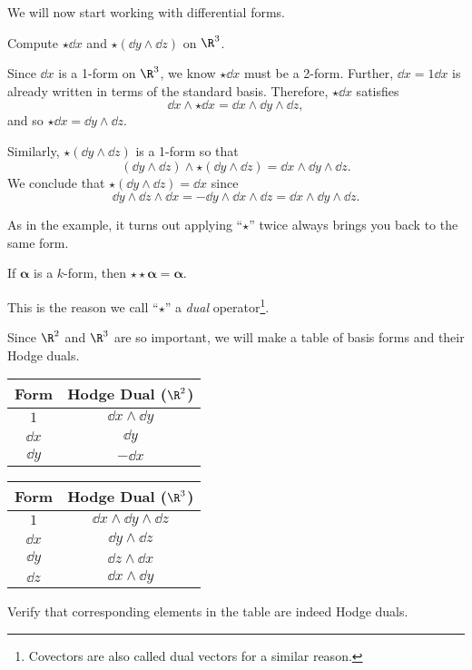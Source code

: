 We will now start working with differential forms.
\begin{example}
	Compute $\star \dd x$ and $\star (\dd y\wedge \dd z)$ on $\R^3$.

	Since $\dd x$ is a 1-form on $\R^3$, we know $\star \dd x$ must be a
	2-form.  Further, $\dd x=1\dd x$ is already written in terms of the standard
	basis.  Therefore, $\star \dd x$ satisfies
	\[
		\dd x\wedge \star \dd x = \dd x\wedge \dd y\wedge \dd z,
	\]
	and so $\star \dd x = \dd y\wedge \dd z$.

	Similarly, $\star (\dd y\wedge \dd z)$ is a 1-form so that
	\[
		(\dd y\wedge \dd z)\wedge \star (\dd y\wedge \dd z) =\dd x\wedge \dd y\wedge \dd z.
	\]
	We conclude that $\star (\dd y\wedge \dd z) = \dd x$ since
	\[
		\dd y\wedge \dd z\wedge \dd x = -\dd y\wedge \dd x\wedge \dd z = \dd x\wedge \dd y\wedge \dd z.
	\]
\end{example}
As in the example, it turns out applying ``$\star$'' twice always brings you back to the
same form.

\begin{theorem}
	If $\bm\alpha$ is a $k$-form, then $\star \star \bm\alpha = \bm\alpha$.
\end{theorem}
This is the reason we call ``$\star$'' a \emph{dual} operator\footnote{
Covectors are also called dual vectors for a similar reason.
}.

Since $\R^2$ and $\R^3$ are so important, we will make a table of basis forms and
their Hodge duals.
\begin{center}
	\begin{tabular}{c|c}
	Form & Hodge Dual ($\R^2$)\\
	\hline
	$1$ & $\dd x\wedge \dd y$\\
	$\dd x$ & $\dd y$\\
	$\dd y$ & $-\dd x$
	\end{tabular}
\end{center}
\begin{center}
	\begin{tabular}{c|c}
	Form & Hodge Dual ($\R^3$)\\
	\hline
	$1$ & $\dd x\wedge \dd y\wedge \dd z$\\
	$\dd x$ & $\dd y\wedge \dd z$\\
	$\dd y$ & $\dd z\wedge \dd x$\\
	$\dd z$ & $\dd x\wedge \dd y$
	\end{tabular}
\end{center}

\begin{exercise}
	Verify that corresponding elements in the table are indeed Hodge duals.
\end{exercise}

